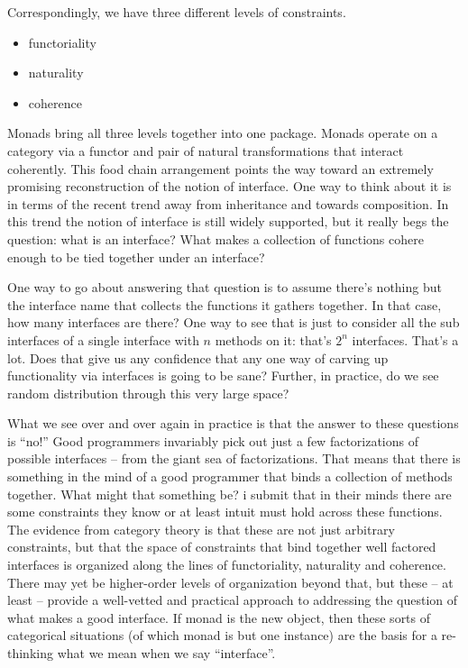 Correspondingly, we have three different levels of constraints.
\begin{itemize}
  \item functoriality
  \item naturality
  \item coherence
\end{itemize}

Monads bring all three levels together into one package. Monads
operate on a category via a functor and pair of natural
transformations that interact coherently. This food chain arrangement
points the way toward an extremely promising reconstruction of the
notion of interface. One way to think about it is in terms of the
recent trend away from inheritance and towards composition. In this
trend the notion of interface is still widely supported, but it really
begs the question: what is an interface? What makes a collection of
functions cohere enough to be tied together under an interface?

One way to go about answering that question is to assume there's
nothing but the interface name that collects the functions it gathers
together. In that case, how many interfaces are there? One way to see
that is just to consider all the sub interfaces of a single interface
with $n$ methods on it: that's $2^n$ interfaces. That's a
lot. Does that give us any confidence that any one way of carving up
functionality via interfaces is going to be sane? Further, in
practice, do we see random distribution through this very large space?

What we see over and over again in practice is that the answer to
these questions is ``no!'' Good programmers invariably pick out just a
few factorizations of possible interfaces -- from the giant sea of
factorizations. That means that there is something in the mind of a
good programmer that binds a collection of methods together. What
might that something be? i submit that in their minds there are some
constraints they know or at least intuit must hold across these
functions. The evidence from category theory is that these are not
just arbitrary constraints, but that the space of constraints that
bind together well factored interfaces is organized along the lines of
functoriality, naturality and coherence. There may yet be higher-order
levels of organization beyond that, but these -- at least -- provide a
well-vetted and practical approach to addressing the question of what
makes a good interface. If monad is the new object, then these sorts
of categorical situations (of which monad is but one instance) are the
basis for a re-thinking what we mean when we say ``interface''.








